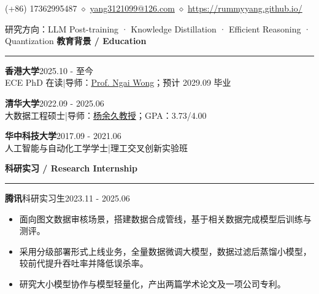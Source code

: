 \documentclass[UTF8,fontset=fandol,11pt,a4paper]{ctexart}
\newenvironment{rSection}[1]{
  \Needspace{7\baselineskip}\medskip
  \textbf{#1}\smallskip\hrule\smallskip
}{\par}
\begin{document}
\begingroup{}\par\medskip\endgroup

\begingroup\centering (+86) 17362995487 $\diamond$ \href{mailto:yang3121099@126.com}{yang3121099@126.com} $\diamond$ \href{https://rummyyang.github.io/}{https://rummyyang.github.io/}\par\endgroup\smallskip
研究方向：LLM Post-training · Knowledge Distillation · Efficient Reasoning · Quantization
\begin{rSection}{教育背景 / Education}
\textbf{香港大学}\hfill 2025.10 - 至今\\
ECE PhD 在读\quad |\quad 导师：\href{https://scholar.google.com/citations?user=PM_uMYIAAAAJ&hl=en}{Prof. Ngai Wong}；预计 2029.09 毕业

\textbf{清华大学}\hfill 2022.09 - 2025.06\\
大数据工程\hspace{0.35em}硕士\quad |\quad 导师：\href{https://scholar.google.com/citations?user=4gH3sxsAAAAJ&hl=en}{杨余久\hspace{0.35em}教授}；GPA：3.73/4.00

\textbf{华中科技大学}\hfill 2017.09 - 2021.06\\
人工智能与自动化工学\hspace{0.35em}学士\quad |\quad 理工交叉创新实验班

\end{rSection}
\begin{rSection}{科研实习 / Research Internship}
\textbf{腾讯}\quad 科研实习生\hfill 2023.11 - 2025.06
\begin{itemize}
\item 面向图文数据审核场景，搭建数据合成管线，基于相关数据完成模型后训练与测评。
\item 采用分级部署形式上线业务，全量数据微调大模型，数据过滤后蒸馏小模型，较前代提升吞吐率并降低误杀率。
\item 研究大小模型协作与模型轻量化，产出两篇学术论文及一项公司专利。
\end{itemize}
\end{rSection}
\end{document}

